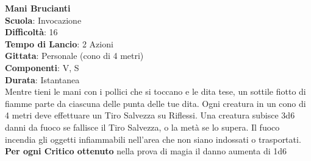 \begin{multicols}{2}
\medskip\textbf{Mani Brucianti}\\
\textbf{Scuola}: Invocazione\\
\textbf{Difficoltà}: 16\\
\textbf{Tempo di Lancio}: 2 Azioni\\
\textbf{Gittata}: Personale (cono di 4 metri)\\
\textbf{Componenti}: V, S\\
\textbf{Durata}: Istantanea\\
Mentre tieni le mani con i pollici che si toccano e le dita tese, un sottile fiotto di fiamme parte da ciascuna delle punta delle tue dita. Ogni creatura in un cono di 4 metri deve effettuare un Tiro Salvezza su Riflessi. Una creatura subisce 3d6 danni da fuoco se fallisce il Tiro Salvezza, o la metà se lo supera. Il fuoco incendia gli oggetti infiammabili nell'area che non siano indossati o trasportati.\\
\textbf{Per ogni Critico ottenuto} nella prova di magia il danno aumenta di 1d6


\end{multicols}
